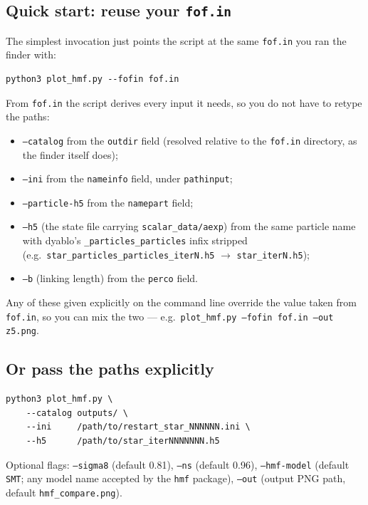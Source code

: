 \documentclass[11pt,a4paper]{article}
\begin{document}
\subsection*{Quick start: reuse your \texttt{fof.in}}

The simplest invocation just points the script at the same \texttt{fof.in}
you ran the finder with:

\begin{lstlisting}
python3 plot_hmf.py --fofin fof.in
\end{lstlisting}

\noindent From \texttt{fof.in} the script derives every input it needs, so you
do not have to retype the paths:
\begin{itemize}
  \item \texttt{--catalog} from the \texttt{outdir} field (resolved relative to
        the \texttt{fof.in} directory, as the finder itself does);
  \item \texttt{--ini} from the \texttt{nameinfo} field, under \texttt{pathinput};
  \item \texttt{--particle-h5} from the \texttt{namepart} field;
  \item \texttt{--h5} (the state file carrying \texttt{scalar\_data/aexp}) from
        the same particle name with dyablo's \texttt{\_particles\_particles}
        infix stripped (e.g.\ \texttt{star\_particles\_particles\_iterN.h5}
        $\rightarrow$ \texttt{star\_iterN.h5});
  \item \texttt{--b} (linking length) from the \texttt{perco} field.
\end{itemize}

\noindent Any of these given explicitly on the command line override the value
taken from \texttt{fof.in}, so you can mix the two --- e.g.\
\texttt{plot\_hmf.py --fofin fof.in --out z5.png}.

\subsection*{Or pass the paths explicitly}

\begin{lstlisting}
python3 plot_hmf.py \
    --catalog outputs/ \
    --ini     /path/to/restart_star_NNNNNN.ini \
    --h5      /path/to/star_iterNNNNNNN.h5
\end{lstlisting}

\noindent Optional flags: \texttt{--sigma8} (default 0.81), \texttt{--ns}
(default 0.96), \texttt{--hmf-model} (default \texttt{SMT}; any model name
accepted by the \texttt{hmf} package), \texttt{--out} (output PNG path,
default \texttt{hmf\_compare.png}).
\end{document}
